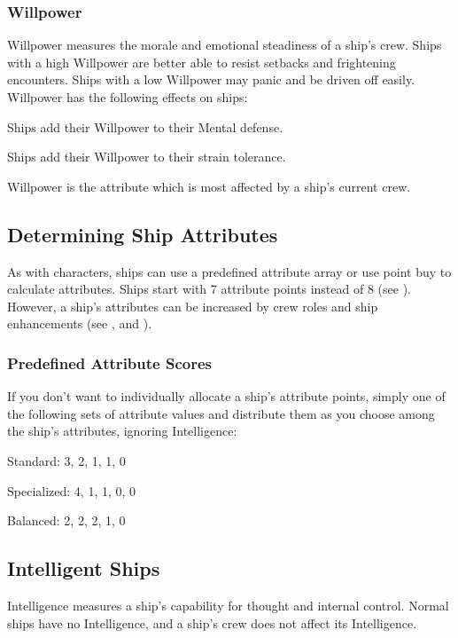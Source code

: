     \subsubsection{Willpower}
      Willpower measures the morale and emotional steadiness of a ship's crew.
      Ships with a high Willpower are better able to resist setbacks and frightening encounters.
      Ships with a low Willpower may panic and be driven off easily.
      Willpower has the following effects on ships:
      \begin{raggeditemize}
        \item Ships add their Willpower to their Mental defense.
        \item Ships add their Willpower to their strain tolerance.
      \end{raggeditemize}

      Willpower is the attribute which is most affected by a ship's current crew.

  \subsection{Determining Ship Attributes}
    As with characters, ships can use a predefined attribute array or use point buy to calculate attributes.
    Ships start with 7 attribute points instead of 8 (see ).
    However, a ship's attributes can be increased by crew roles and ship enhancements (see , and ).

    \subsubsection{Predefined Attribute Scores}
      If you don't want to individually allocate a ship's attribute points, simply one of the following sets of attribute values and distribute them as you choose among the ship's attributes, ignoring Intelligence:
      \begin{raggeditemize}
        \item Standard: 3, 2, 1, 1, 0
        \item Specialized: 4, 1, 1, 0, 0
        \item Balanced: 2, 2, 2, 1, 0
      \end{raggeditemize}

  \subsection{Intelligent Ships}
    Intelligence measures a ship's capability for thought and internal control.
    Normal ships have no Intelligence, and a ship's crew does not affect its Intelligence.

